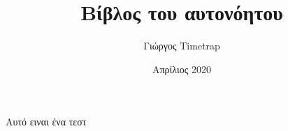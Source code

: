 \documentclass[a4paper,10pt]{book}
\author{Γιώργος \latintext Timetrap}
\date{Απρίλιος 2020}
\title{Βίβλος του αυτονόητου}
\begin{document}
\begin{titlepage}
\maketitle
\end{titlepage}

\section{}


\greektext

Αυτό ειναι ένα τεστ
\end{document}
